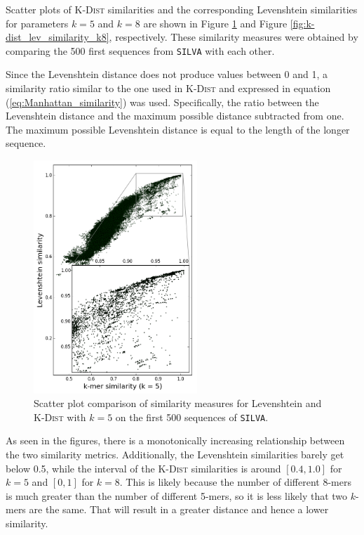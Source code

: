 Scatter plots of \textsc{K-Dist} similarities and the corresponding Levenshtein
similarities for parameters $k=5$ and $k=8$ are shown in Figure
\ref{fig:k-dist_lev_similarity_k5} and Figure
\ref{fig:k-dist_lev_similarity_k8}, respectively. These similarity measures
were obtained by comparing the 500 first sequences from \texttt{SILVA} with
each other.

Since the Levenshtein distance does not produce values between 0 and 1, a
similarity ratio similar to the one used in \textsc{K-Dist} and expressed in
equation (\ref{eq:Manhattan_similarity}) was used. Specifically, the ratio
between the Levenshtein distance and the maximum possible distance subtracted
from one. The maximum possible Levenshtein distance is equal to the length of
the longer sequence.

\begin{figure}
  \includegraphics[width=0.55\textwidth]{graphics/Levenshtein_K-Dist_k5.png}
  \caption{Scatter plot comparison of similarity measures for Levenshtein and
    \textsc{K-Dist} with $k=5$ on the first 500 sequences of \texttt{SILVA}.}
  \label{fig:k-dist_lev_similarity_k5}
\end{figure}

As seen in the figures, there is a monotonically increasing relationship
between the two similarity metrics. Additionally, the Levenshtein similarities
barely get below 0.5, while the interval of the \textsc{K-Dist} similarities is
around $[0.4,1.0]$ for $k=5$ and $[0,1]$ for $k=8$. This is likely because the
number of different 8-mers is much greater than the number of different 5-mers,
so it is less likely that two $k$-mers are the same. That will result in a
greater distance and hence a lower similarity.

